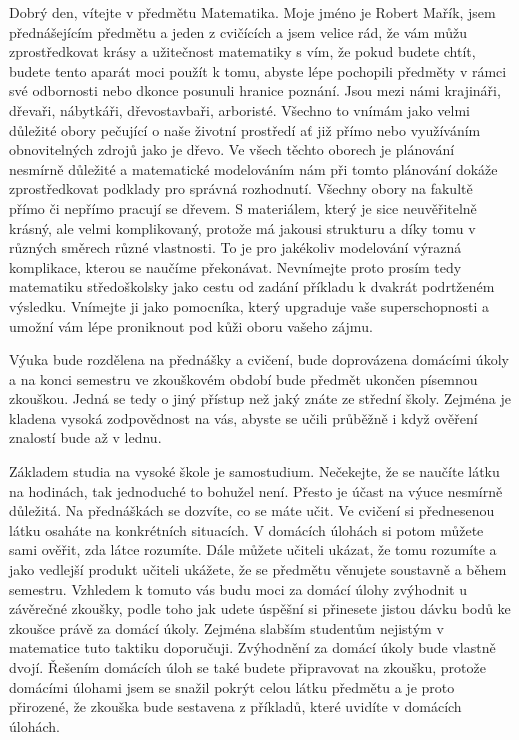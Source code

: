 \documentclass[12pt]{article}
\begin{document}
Dobrý den, vítejte v předmětu Matematika. Moje jméno je Robert Mařík, jsem přednášejícím předmětu a jeden z cvičících a jsem velice rád, že vám můžu zprostředkovat krásy a užitečnost matematiky s vím, že pokud budete chtít, budete tento aparát moci použít k tomu, abyste lépe pochopili předměty v rámci své odbornosti nebo dkonce posunuli hranice poznání. Jsou mezi námi krajináři, dřevaři, nábytkáři, dřevostavbaři, arboristé. Všechno to vnímám jako velmi důležité obory pečující o naše životní prostředí ať již přímo nebo využíváním obnovitelných zdrojů jako je dřevo. Ve všech těchto oborech je plánování nesmírně důležité a matematické modelováním nám při tomto plánování dokáže zprostředkovat podklady pro správná rozhodnutí. Všechny obory na fakultě přímo či nepřímo pracují se dřevem. S materiálem, který je sice neuvěřitelně krásný, ale velmi komplikovaný, protože má jakousi strukturu a díky tomu v různých směrech různé vlastnosti. To je pro jakékoliv modelování výrazná komplikace, kterou se naučíme překonávat. Nevnímejte proto prosím tedy matematiku středoškolsky jako cestu od zadání příkladu k dvakrát podrtženém výsledku. Vnímejte ji jako pomocníka, který upgraduje vaše superschopnosti a umožní vám lépe proniknout pod kůži oboru vašeho zájmu.

Výuka bude rozdělena na přednášky a cvičení, bude doprovázena domácími úkoly a na konci semestru ve zkouškovém období bude předmět ukončen písemnou zkouškou. Jedná se tedy o jiný přístup než jaký znáte ze střední školy. Zejména je kladena vysoká zodpovědnost na vás, abyste se učili průběžně i když ověření znalostí bude až v lednu.

Základem studia na vysoké škole je samostudium. Nečekejte, že se naučíte látku na hodinách, tak jednoduché to bohužel není. Přesto je účast na výuce nesmírně důležitá. Na přednáškách se dozvíte, co se máte učit. Ve cvičení si přednesenou látku osaháte na konkrétních situacích. V domácích úlohách si potom můžete sami ověřit, zda látce rozumíte. Dále můžete učiteli ukázat, že tomu rozumíte a jako vedlejší produkt učiteli ukážete, že se předmětu věnujete soustavně a během semestru. Vzhledem k tomuto vás budu moci za domácí úlohy zvýhodnit u závěrečné zkoušky, podle toho jak udete úspěšní si přinesete jistou dávku bodů ke zkoušce právě za domácí úkoly. Zejména slabším studentům nejistým v matematice tuto taktiku doporučuji. Zvýhodnění za domácí úkoly bude vlastně dvojí. Řešením domácích úloh se také budete připravovat na zkoušku, protože domácími úlohami jsem se snažil pokrýt celou látku předmětu a je proto přirozené, že zkouška bude sestavena z příkladů, které uvidíte v domácích úlohách.
\end{document}
